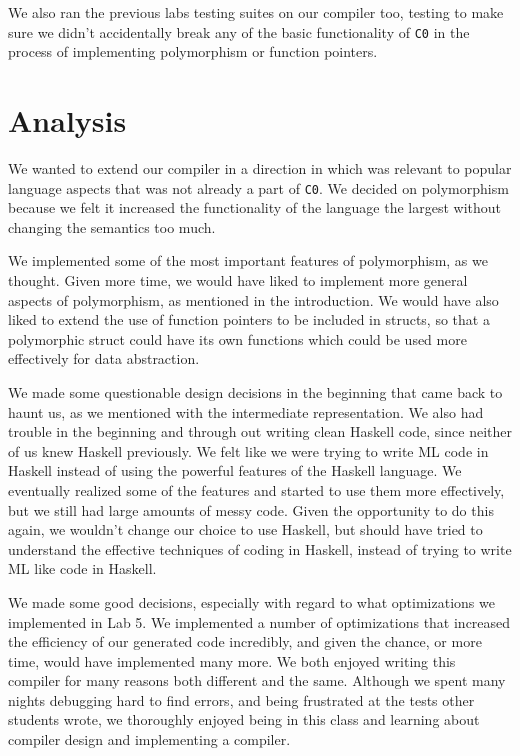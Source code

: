\documentclass[aps,letterpaper,11pt]{revtex4}
\newcommand{\ttt}[1]{\texttt{#1}}
\begin{document}
We also ran the previous labs testing suites on our compiler too, testing to
make sure we didn't accidentally break any of the basic functionality of
\ttt{C0} in the process of implementing polymorphism or function pointers.\\

\newpage
\section{Analysis}
We wanted to extend our compiler in a direction in which was relevant to
popular language aspects that was not already a part of \ttt{C0}. We decided
on polymorphism because we felt it increased the functionality of the language
the largest without changing the semantics too much.

We implemented some of the most important features of polymorphism, as we
thought. Given more time, we would have liked to implement more general
aspects of polymorphism, as mentioned in the introduction. We would have also
liked to extend the use of function pointers to be included in structs, so
that a polymorphic struct could have its own functions which could be used
more effectively for data abstraction.

We made some questionable design decisions in the beginning that came back
to haunt us, as we mentioned with the intermediate representation. We also
had trouble in the beginning and through out writing clean Haskell code, since
neither of us knew Haskell previously. We felt like we were trying to write
ML code in Haskell instead of using the powerful features of the Haskell
language. We eventually realized some of the features and started to use them
more effectively, but we still had large amounts of messy code. Given the
opportunity to do this again, we wouldn't change our choice to use Haskell,
but should have tried to understand the effective techniques of coding in
Haskell, instead of trying to write ML like code in Haskell.

We made some good decisions, especially with regard to what optimizations we
implemented in Lab 5. We implemented a number of optimizations that
increased the efficiency of our generated code incredibly, and given the
chance, or more time, would have implemented many more. We both enjoyed
writing this compiler for many reasons both different and the same. Although
we spent many nights debugging hard to find errors, and being frustrated at
the tests other students wrote, we thoroughly enjoyed being in this class and
learning about compiler design and implementing a compiler.
\end{document}
